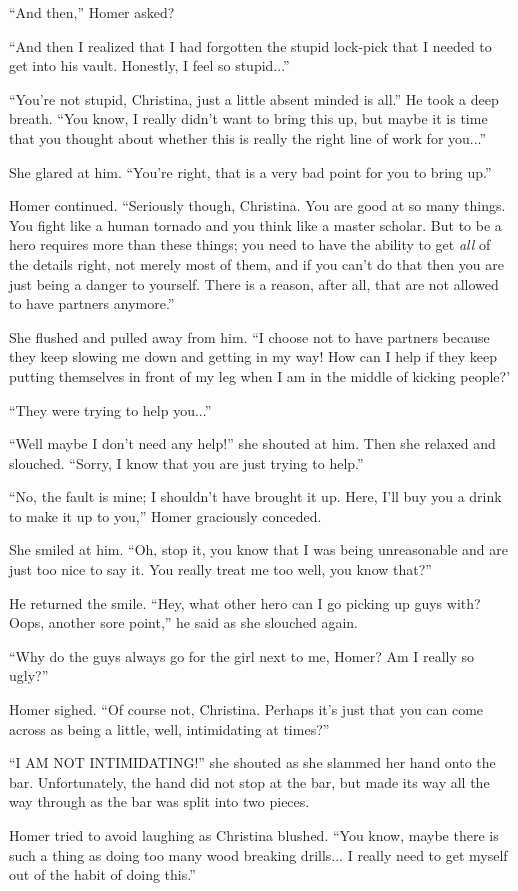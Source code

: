 ``And then,''  Homer asked?

``And then I realized that I had forgotten the stupid lock-pick that I needed to get into his vault.  Honestly, I feel so stupid...''

``You're not stupid, Christina, just a little absent minded is all.''  He took a deep breath.  ``You know, I really didn't want to bring this up, but maybe it is time that you thought about whether this is really the right line of work for you...''

She glared at him.  ``You're right, that is a very bad point for you to bring up.''

Homer continued.  ``Seriously though, Christina.  You are good at so many things.  You fight like a human tornado and you think like a master scholar.  But to be a hero requires more than these things;  you need to have the ability to get \emph{all} of the details right, not merely most of them, and if you can't do that then you are just being a danger to yourself.  There is a reason, after all, that are not allowed to have partners anymore.''

She flushed and pulled away from him.  ``I choose not to have partners because they keep slowing me down and getting in my way!  How can I help if they keep putting themselves in front of my leg when I am in the middle of kicking people?'

``They were trying to help you...''

``Well maybe I don't need any help!'' she shouted at him.  Then she relaxed and slouched.  ``Sorry, I know that you are just trying to help.''

``No, the fault is mine;  I shouldn't have brought it up.  Here, I'll buy you a drink to make it up to you,'' Homer graciously conceded.

She smiled at him.  ``Oh, stop it, you know that I was being unreasonable and are just too nice to say it.  You really treat me too well, you know that?''

He returned the smile.  ``Hey, what other hero can I go picking up guys with?  Oops, another sore point,'' he said as she slouched again.

``Why do the guys always go for the girl next to me, Homer?  Am I really so ugly?''

Homer sighed.  ``Of course not, Christina.  Perhaps it's just that you can come across as being a little, well, intimidating at times?''

``I AM NOT INTIMIDATING!''  she shouted as she slammed her hand onto the bar.  Unfortunately, the hand did not stop at the bar, but made its way all the way through as the bar was split into two pieces.

Homer tried to avoid laughing as Christina blushed.  ``You know, maybe there is such a thing as doing too many wood breaking drills...  I really need to get myself out of the habit of doing this.''

